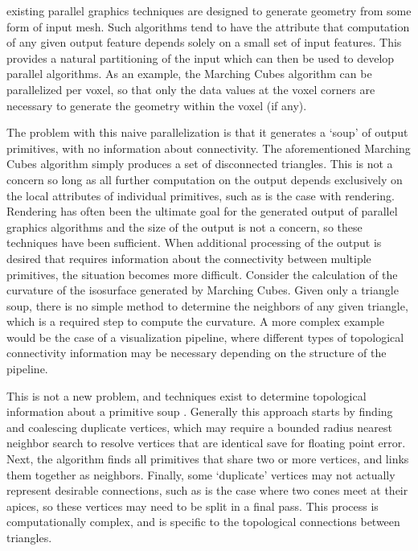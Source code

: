 \documentclass[10pt,journal,cspaper,compsoc]{IEEEtran}
\begin{document}
% 
% 
% 
% 
 existing parallel graphics techniques are designed to generate geometry from
some form of input mesh. Such algorithms tend to have the attribute that
computation of any given output feature depends solely on a small set
of input features. This provides a natural partitioning of the input
which can then be used to develop parallel algorithms. As an example,
the Marching Cubes \cite{Lorensen1987} algorithm can be parallelized per voxel, so that only
the data values at the voxel corners are necessary to generate the geometry
within the voxel (if any).

The problem with this naive parallelization is that it generates a
`soup' of output primitives, with no information about connectivity.
The aforementioned Marching Cubes algorithm simply produces a set of disconnected triangles.
This is not a concern so long as all further computation on the output
depends exclusively on the local attributes of individual primitives, such as is
the case with rendering. Rendering has often been the ultimate goal for the
generated output of parallel graphics algorithms and the size of the output is not a concern, so these techniques have been sufficient. When
additional processing of the output is desired that requires information about the connectivity 
between multiple primitives, the situation becomes more difficult. Consider the calculation of 
the curvature of the isosurface generated by Marching Cubes.
Given only a triangle soup, there is no simple method to determine the neighbors of any given triangle, which is a required step to 
compute the curvature. A more complex example would be the case of a visualization pipeline,
where different types of topological connectivity information may be necessary depending
on the structure of the pipeline.

This is not a new problem, and techniques exist to determine topological
information about a primitive soup \cite{Park}. Generally this approach starts by finding 
and coalescing duplicate vertices, which may require a bounded radius nearest neighbor search to 
resolve vertices that are identical save for floating point error. Next, the algorithm finds all primitives that 
share two or more vertices, and links them together as neighbors. Finally,
some `duplicate' vertices may not actually represent desirable connections,
such as is the case where two cones meet at their apices, so these vertices
may need to be split in a final pass. This process is computationally complex, and is
specific to the topological connections between triangles. 
\end{document}
